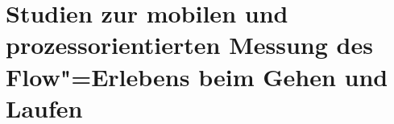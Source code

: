 

\chapter{Studien zur mobilen und prozessorientierten Messung des Flow"=Erlebens beim Gehen und Laufen} 

\label{cha:studien_zur_mobilen_und_prozessorientierten_messung}

    

